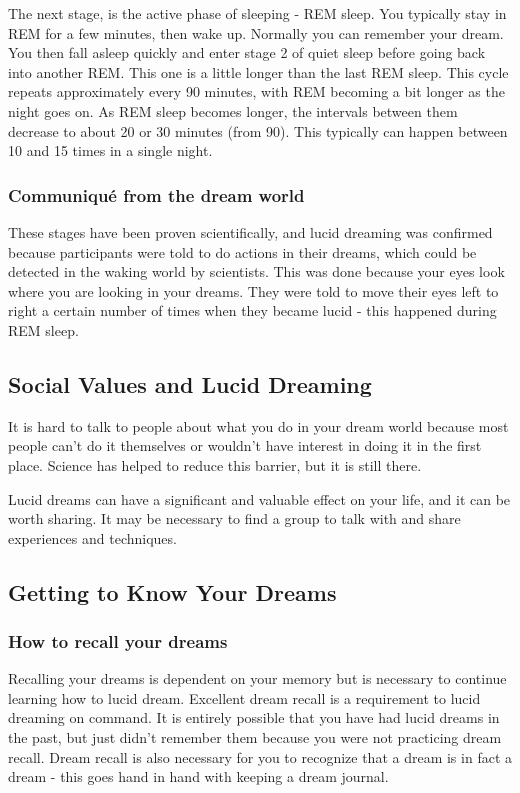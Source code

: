 \documentclass{article}
\begin{document}
The next stage, is the active phase of sleeping - REM sleep. You typically stay in REM for a few minutes, then wake up. Normally you can remember your dream. You then fall asleep quickly and enter stage 2 of quiet sleep before going back into another REM. This one is a little longer than the last REM sleep. This cycle repeats approximately every 90 minutes, with REM becoming a bit longer as the night goes on. As REM sleep becomes longer, the intervals between them decrease to about 20 or 30 minutes (from 90). This typically can happen between 10 and 15 times in a single night.

\subsubsection{Communiqu\'{e} from the dream world}
These stages have been proven scientifically, and lucid dreaming was confirmed because participants were told to do actions in their dreams, which could be detected in the waking world by scientists. This was done because your eyes look where you are looking in your dreams. They were told to move their eyes left to right a certain number of times when they became lucid - this happened during REM sleep.

\subsection{Social Values and Lucid Dreaming}
It is hard to talk to people about what you do in your dream world because most people can't do it themselves or wouldn't have interest in doing it in the first place. Science has helped to reduce this barrier, but it is still there.

Lucid dreams can have a significant and valuable effect on your life, and it can be worth sharing. It may be necessary to find a group to talk with and share experiences and techniques.

\subsection{Getting to Know Your Dreams}
\subsubsection{How to recall your dreams}
Recalling your dreams is dependent on your memory but is necessary to continue learning how to lucid dream. Excellent dream recall is a requirement to lucid dreaming on command. It is entirely possible that you have had lucid dreams in the past, but just didn't remember them because you were not practicing dream recall. Dream recall is also necessary for you to recognize that a dream is in fact a dream - this goes hand in hand with keeping a dream journal.
\end{document}
